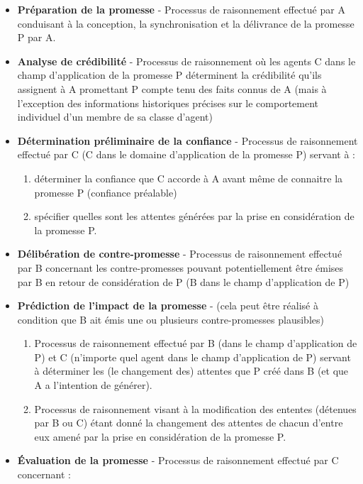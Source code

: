 \begin{itemize}
  \item \textbf{Préparation de la promesse} -
	Processus de raisonnement effectué par A conduisant à la conception, la
	synchronisation et la délivrance de la promesse P par A.
  \item \textbf{Analyse de crédibilité} -
	Processus de raisonnement où les agents C dans le champ d'application de
	la promesse P déterminent la crédibilité qu'ils assignent à A promettant
	P compte tenu des faits connus de A (mais à l'exception des informations
	historiques précises sur le comportement individuel d'un membre de sa
	classe d'agent)
  \item \textbf{Détermination préliminaire de la confiance} -
	Processus de raisonnement effectué par C (C dans le domaine
	d'application de la promesse P) servant à :
  	\begin{enumerate}
	  \item déterminer la confiance que C accorde à A avant même de
		  connaitre la promesse P (confiance préalable)
	  \item spécifier quelles sont les attentes générées par la prise en
		  considération de la promesse P.
  	\end{enumerate}
  \item \textbf{Délibération de contre-promesse} -
	Processus de raisonnement effectué par B concernant les contre-promesses
	pouvant potentiellement être émises par B en retour de considération de
	P (B dans le champ d'application de P)
  \item \textbf{Prédiction de l'impact de la promesse} -
	(cela peut être réalisé à condition que B ait émis une ou plusieurs
	contre-promesses plausibles)
  	\begin{enumerate}
	  \item Processus de raisonnement effectué par B (dans le champ
		  d'application de P) et C (n'importe quel agent dans le champ
		  d'application de P) servant à déterminer les (le changement
		  des) attentes que P créé dans B (et que A a l'intention de
		  générer).  
	  \item Processus de raisonnement visant à la modification des ententes
		  (détenues par B ou C) étant donné la changement des attentes
		  de chacun d'entre eux amené par la prise en considération de
		  la promesse P.
  	\end{enumerate}
  \item \textbf{Évaluation de la promesse} -
	Processus de raisonnement effectué par C concernant :

\end{itemize}
